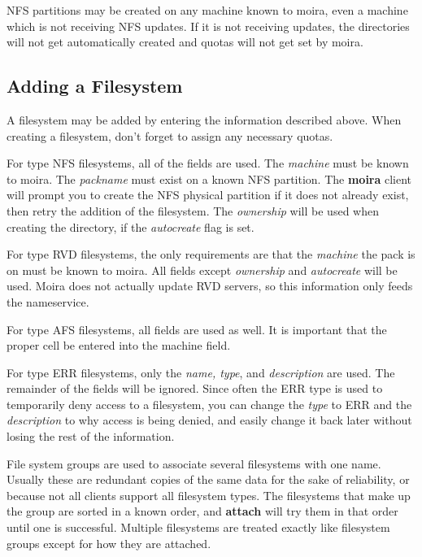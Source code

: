 NFS partitions may be created on any machine known to moira, even a
machine which is not receiving NFS updates.  If it is not receiving
updates, the directories will not get automatically created and quotas
will not get set by moira.

\subsection{Adding a Filesystem}

A filesystem may be added by entering the information described above.
When creating a filesystem, don't forget to assign any necessary quotas.

For type NFS filesystems, all of the fields are used.  The {\em machine}
must be known to moira.  The {\em packname} must exist on a known NFS
partition.  The {\bf moira} client will prompt you to create the NFS
physical partition if it does not already exist, then retry the
addition of the filesystem.  The {\em ownership} will be used when
creating the directory, if the {\em autocreate} flag is set.

For type RVD filesystems, the only requirements are that the {\em machine}
the pack is on must be known to moira.  All fields except {\em ownership}
and {\em autocreate} will be used.  Moira does not actually update RVD
servers, so this information only feeds the nameservice.

For type AFS filesystems, all fields are used as well.  It is
important that the proper cell be entered into the machine field.

For type ERR filesystems, only the {\em name, type}, and {\em description} are
used.  The remainder of the fields will be ignored.  Since often the ERR
type is used to temporarily deny access to a filesystem, you can
change the {\em type} to ERR and the {\em description} to why access is being
denied, and easily change it back later without losing the rest of the
information. 

File system groups are used to associate several filesystems with one
name.  Usually these are redundant copies of the same data for the
sake of reliability, or because not all clients support all filesystem
types.  The filesystems that make up the group are sorted in a known
order, and {\bf attach} will try them in that order until one is
successful.  Multiple filesystems are treated exactly like filesystem
groups except for how they are attached.

